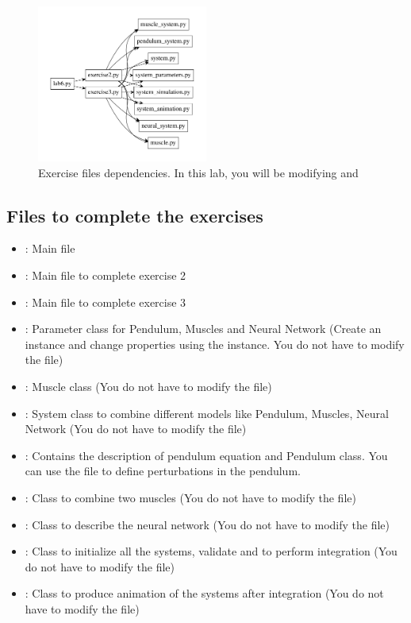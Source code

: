 \documentclass{cmc}
\begin{document}
\begin{figure}[ht]
  \centering \includegraphics[width=0.5\textwidth]{figures/files_lab6}
  \caption{\label{fig:files_lab6} Exercise files dependencies. In this lab,
    you will be modifying  and
    }
\end{figure}

\subsection*{Files to complete the exercises}
\label{sec:intro_lab6}

\begin{itemize}
\item {} : Main file
\item {} : Main file to complete exercise 2
\item {} : Main file to complete exercise 3
\item {} : Parameter class for Pendulum,
  Muscles and Neural Network (Create an instance and change properties
  using the instance. You do not have to modify the file)
\item {} : Muscle class (You do not have to modify
  the file)
\item {} : System class to combine different models %
  like Pendulum, Muscles, Neural Network (You do not have to modify
  the file)
\item {} : Contains the description of
  pendulum equation and Pendulum class. You can use the file to define
  perturbations in the pendulum.
\item {} : Class to combine two muscles (You
  do not have to modify the file)
\item {} : Class to describe the neural
  network (You do not have to modify the file)
\item {} : Class to initialize all the
  systems, validate and to perform integration (You do not have to
  modify the file)
\item {} : Class to produce animation of
  the systems after integration (You do not have to modify the file)
\end{itemize}
\end{document}
